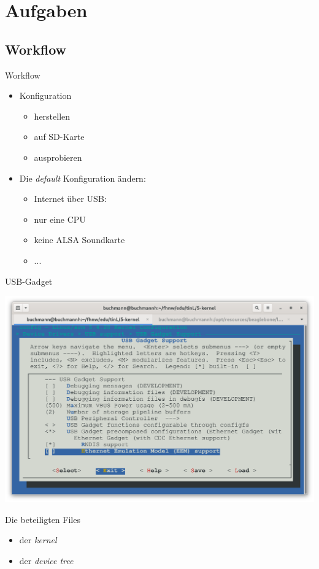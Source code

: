\section{Aufgaben}
\subsection{Workflow}
\begin{frame}{Workflow}
 \begin{itemize}
  \item {} Konfiguration
  \begin{itemize}
   \item herstellen
   \item auf SD-Karte
   \item ausprobieren
  \end{itemize}
  \item Die {\em default} Konfiguration ändern:
  \begin{itemize}
   \item Internet über USB:
   
\begin{minipage}{0.75\linewidth}
\end{minipage}
   \item nur eine CPU
   \item keine ALSA Soundkarte
   \item ... 
  \end{itemize}
 \end{itemize}
\end{frame}

\begin{frame}{USB-Gadget}

\includegraphics[width=1\textwidth]{usb-gadget.png}
\end{frame}

\begin{frame}{Die beteiligten Files}
 \begin{itemize}
  \item {} der {\em kernel}
  \item {} der {\em device tree}
 \end{itemize}
\end{frame}
